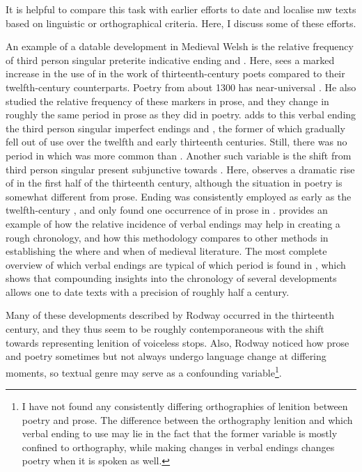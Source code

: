 It is helpful to compare this task with earlier efforts to date and localise \gls{mw} texts based on linguistic or orthographical criteria. Here, I discuss some of these efforts.

An example of a datable development in Medieval Welsh is the relative frequency of third person singular preterite indicative ending  and . Here, \textcite{Rod_Datable98} sees a marked increase in the use of  in the work of thirteenth-century poets compared to their twelfth-century counterparts. Poetry from about 1300 has near-universal . He also studied the relative frequency of these markers in prose, and they change in roughly the same period in prose as they did in poetry. \Textcite[68--71]{Rod_Two03} adds to this verbal ending the third person singular imperfect endings  and \ei, the former of which gradually fell out of use over the twelfth and early thirteenth centuries. Still, there was no period in which  was more common than \ei. Another such variable is the shift from third person singular present subjunctive  towards . Here, \textcite[71--73]{Rod_Two03} observes a dramatic rise of  in the first half of the thirteenth century, although the situation in poetry is somewhat different from prose. Ending  was consistently employed as early as the twelfth-century , and \textcite[73]{Rod_Two03} only found one occurrence of  in prose in . \Textcite{Rod_Where07} provides an example of how the relative incidence of verbal endings may help in creating a rough chronology, and how this methodology compares to other methods in establishing the where and when of medieval literature. The most complete overview of which verbal endings are typical of which period is found in \textcite[166]{rodway_dating_2013}, which shows that compounding insights into the chronology of several developments allows one to date texts with a precision of roughly half a century.

Many of these developments described by Rodway occurred in the thirteenth century, and they thus seem to be roughly contemporaneous with the shift towards representing lenition of voiceless stops. Also, Rodway noticed how prose and poetry sometimes but not always undergo language change at differing moments, so textual genre may serve as a confounding variable\footnote{I have not found any consistently differing orthographies of lenition between poetry and prose. The difference between the orthography lenition and which verbal ending to use may lie in the fact that the former variable is mostly confined to orthography, while making changes in verbal endings changes poetry when it is spoken as well.}.

